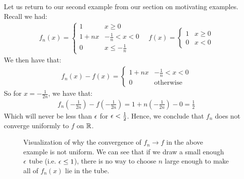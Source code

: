 \begin{nexample}{}{}
    Let us return to our second example from our section on motivating examples. Recall we had:
    \begin{align*}
        f_n(x) = \begin{cases}
            1 & x \geq 0
            \\ 1 + nx & -\frac{1}{n} < x < 0
            \\ 0 & x \leq -\frac{1}{n}
        \end{cases} \quad f(x) = \begin{cases}
            1 & x \geq 0
            \\ 0 & x < 0
        \end{cases}
    \end{align*}
    We then have that:
    \begin{align*}
        f_n(x) - f(x) = \begin{cases}
            1 + nx & -\frac{1}{n} < x < 0
            \\ 0 & \text{otherwise}
        \end{cases}
    \end{align*}
    So for $x = -\frac{1}{2n}$, we have that:
    \begin{align*}
        f_n\left(-\frac{1}{2n}\right) - f\left(-\frac{1}{2n}\right) = 1 + n\left(-\frac{1}{2n}\right) - 0 = \frac{1}{2}
    \end{align*}
    Which will never be less than $\epsilon$ for $\epsilon < \frac{1}{2}$. Hence, we conclude that $f_n$ does not converge uniformly to $f$ on $\mathbb{R}$. 
\end{nexample}
\begin{figure}[htbp]
    \centering
    
    \caption{Visualization of why the convergence of $f_n \rightarrow f$ in the above example is not uniform. We can see that if we draw a small enough $\epsilon$ tube (i.e. $\epsilon \leq 1$), there is no way to choose $n$ large enough to make all of $f_n(x)$ lie in the tube.}
    \label{fig41}
\end{figure}
